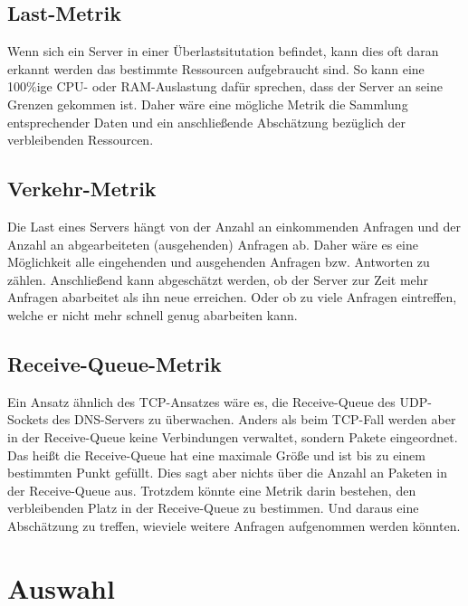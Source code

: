 \documentclass[a4paper, 12pt, BCOR10mm, DIV12, toc=bibliography, toc=listof, german]{scrbook}
\begin{document}
		\subsection*{Last-Metrik} %

		Wenn sich ein Server in einer Überlastsitutation befindet, kann dies oft daran erkannt werden
		das bestimmte Ressourcen aufgebraucht sind. So kann eine 100\%ige CPU- oder RAM-Auslastung dafür
		sprechen, dass der Server an seine Grenzen gekommen ist. Daher wäre eine mögliche Metrik die
		Sammlung entsprechender Daten und ein anschließende Abschätzung bezüglich der verbleibenden
		Ressourcen.
		

		\subsection*{Verkehr-Metrik} %

		Die Last eines Servers hängt von der Anzahl an einkommenden Anfragen und der Anzahl an
		abgearbeiteten (ausgehenden) Anfragen ab. Daher wäre es eine Möglichkeit alle eingehenden und
		ausgehenden Anfragen bzw. Antworten zu zählen. Anschließend kann abgeschätzt werden, ob der
		Server zur Zeit mehr Anfragen abarbeitet als ihn neue erreichen. Oder ob zu viele Anfragen
		eintreffen, welche er nicht mehr schnell genug abarbeiten kann.
		

		\subsection*{Receive-Queue-Metrik} %
	
		Ein Ansatz ähnlich des TCP-Ansatzes wäre es, die Receive-Queue des UDP-Sockets des DNS-Servers zu
		überwachen. Anders als beim TCP-Fall werden aber in der Receive-Queue keine Verbindungen
		verwaltet, sondern Pakete eingeordnet. Das heißt die Receive-Queue hat eine maximale Größe und
		ist bis zu einem bestimmten Punkt gefüllt. Dies sagt aber nichts über die Anzahl an Paketen in
		der Receive-Queue aus. Trotzdem könnte eine Metrik darin bestehen, den verbleibenden Platz in
		der Receive-Queue zu bestimmen. Und daraus eine Abschätzung zu treffen, wieviele weitere
		Anfragen aufgenommen werden könnten.

		

		\section{Auswahl} %
		\label{sec:auswahl}
\end{document}
